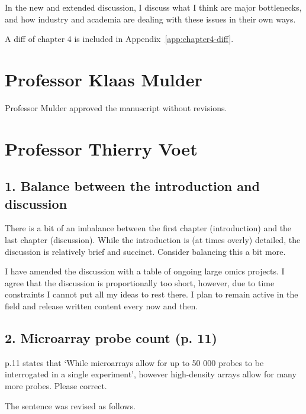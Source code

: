 \documentclass[11pt,a4paper]{article}
\begin{document}
In the new and extended discussion, I discuss what I think are major bottlenecks, and how industry and academia are dealing with these issues in their own ways.

A diff of chapter 4 is included in Appendix~\ref{app:chapter4-diff}.

\section*{\sffamily\color{heading}Professor Klaas Mulder}

Professor Mulder approved the manuscript without revisions.

\section*{\sffamily\color{heading}Professor Thierry Voet}

\subsection*{\sffamily\color{heading}1. Balance between the introduction and discussion}

\begin{reviewcomment}
There is a bit of an imbalance between the first chapter (introduction) and the last chapter (discussion). While the introduction is (at times overly) detailed, the discussion is relatively brief and succinct. Consider balancing this a bit more.
\end{reviewcomment}

I have amended the discussion with a table of ongoing large omics projects. I agree that the discussion is proportionally too short, however, due to time constraints I cannot put all my ideas to rest there. I plan to remain active in the field and release written content every now and then.

\subsection*{\sffamily\color{heading}2. Microarray probe count (p. 11)}

\begin{reviewcomment}
p.11 states that ‘While microarrays allow for up to 50 000 probes to be interrogated in a single experiment', however high-density arrays allow for many more probes. Please correct.
\end{reviewcomment}

The sentence was revised as follows.
\end{document}
